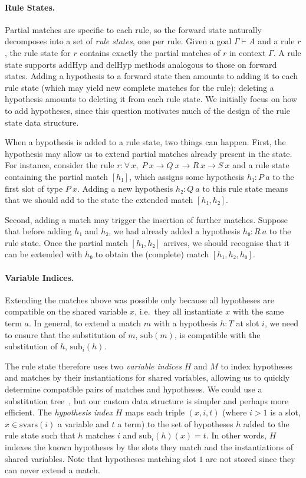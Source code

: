 \documentclass[runningheads,leqno]{llncs}
\newcommand{\para}[1]{\paragraph{\bfseries\upshape #1}}
\newcommand{\All}[2]{\ensuremath{\forall\, #1,\; #2}}
\newcommand{\vars}{\ensuremath{\mathrm{svars}}}
\newcommand{\sub}{\ensuremath{\mathrm{sub}}}
\newcommand{\addHyp}{\ensuremath{\mathrm{addHyp}}}
\newcommand{\delHyp}{\ensuremath{\mathrm{delHyp}}}
\begin{document}
\para{Rule States.}
Partial matches are specific to each rule, so the forward state naturally decomposes into a set of \emph{rule states}, one per rule.
Given a goal $Γ ⊢ A$ and a rule $r$, the rule state for $r$ contains exactly the partial matches of $r$ in context $Γ$.
A rule state supports $\addHyp$ and $\delHyp$ methods analogous to those on forward states.
Adding a hypothesis to a forward state then amounts to adding it to each rule state (which may yield new complete matches for the rule); deleting a hypothesis amounts to deleting it from each rule state.
We initially focus on how to add hypotheses, since this question motivates much of the design of the rule state data structure.

When a hypothesis is added to a rule state, two things can happen.
First, the hypothesis may allow us to extend partial matches already present in the state.
For instance, consider the rule $r : \All{x}{P~x → Q~x → R~x → S~x}$ and a rule state containing the partial match $[h₁]$, which assigns some hypothesis $h₁ : P~a$ to the first slot of type $P~x$.
Adding a new hypothesis $h₂ : Q~a$ to this rule state means that we should add to the state the extended match $[h₁, h₂]$.

Second, adding a match may trigger the insertion of further matches.
Suppose that before adding $h₁$ and $h₂$, we had already added a hypothesis $h₀ : R~a$ to the rule state.
Once the partial match $[h₁, h₂]$ arrives, we should recognise that it can be extended with $h₀$ to obtain the (complete) match $[h₁, h₂, h₀]$.

\para{Variable Indices.}
Extending the matches above was possible only because all hypotheses are compatible on the shared variable $x$, i.e.\ they all instantiate $x$ with the same term $a$.
In general, to extend a match $m$ with a hypothesis $h : T$ at slot $i$, we need to ensure that the substitution of $m$, $\sub(m)$, is compatible with the substitution of $h$, $\sub_{i}(h)$.

The rule state therefore uses two \emph{variable indices} $H$ and $M$ to index hypotheses and matches by their instantiations for shared variables, allowing us to quickly determine compatible pairs of matches and hypotheses.
We could use a substitution tree~\cite{SubstitutionTrees}, but our custom data structure is simpler and perhaps more efficient.
The \emph{hypothesis index} $H$ maps each triple $(x, i, t)$ (where $i > 1$ is a slot, $x ∈ \vars(i)$ a variable and $t$ a term) to the set of hypotheses $h$ added to the rule state such that $h$ matches $i$ and $\sub_{i}(h)(x) = t$.
In other words, $H$ indexes the known hypotheses by the slots they match and the instantiations of shared variables.
Note that hypotheses matching slot $1$ are not stored since they can never extend a match.
\end{document}
